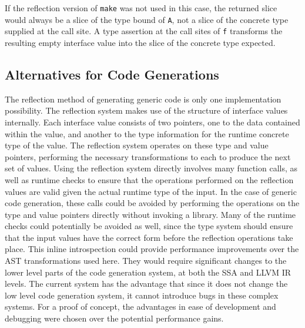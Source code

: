 \documentclass[letterpaper,twocolumn,11pt]{article}
\begin{document}
If the reflection version of \texttt{make} was not used in this case, the returned slice would always be a slice of the type bound of \texttt{A}, not a slice of the concrete type supplied at the call site. A type assertion at the call sites of \texttt{f} transforms the resulting empty interface value into the slice of the concrete type expected.

\subsection{Alternatives for Code Generations} \label{code_gen_alt}

The reflection method of generating generic code is only one implementation possibility. The reflection system makes use of the structure of interface values internally. Each interface value consists of two pointers, one to the data contained within the value, and another to the type information for the runtime concrete type of the value. The reflection system operates on these type and value pointers, performing the necessary transformations to each to produce the next set of values. Using the reflection system directly involves many function calls, as well as runtime checks to ensure that the operations performed on the reflection values are valid given the actual runtime type of the input. In the case of generic code generation, these calls could be avoided by performing the operations on the type and value pointers directly without invoking a library. Many of the runtime checks could potentially be avoided as well, since the type system should ensure that the input values have the correct form before the reflection operations take place. This inline introspection could provide performance improvements over the AST transformations used here. They would require significant changes to the lower level parts of the code generation system, at both the SSA and LLVM IR levels. The current system has the advantage that since it does not change the low level code generation system, it cannot introduce bugs in these complex systems. For a proof of concept, the advantages in ease of development and debugging were chosen over the potential performance gains.
\end{document}
